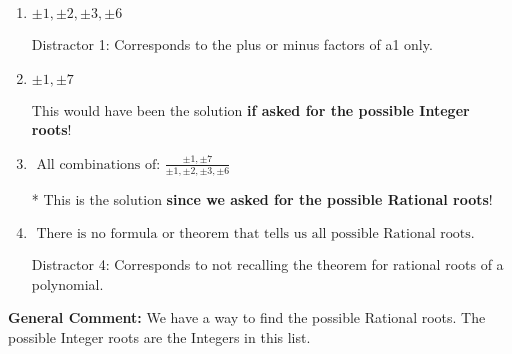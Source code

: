 \documentclass{extbook}[14pt]
\begin{document}
\begin{enumerate}
{\begin{enumerate}[label=\Alph*.]
 Distractor 3: Corresponds to the plus or minus of the inverse quotient (an/a0) of the factors. 
\item \( \pm 1,\pm 2,\pm 3,\pm 6 \)

 Distractor 1: Corresponds to the plus or minus factors of a1 only.
\item \( \pm 1,\pm 7 \)

This would have been the solution \textbf{if asked for the possible Integer roots}!
\item \( \text{ All combinations of: }\frac{\pm 1,\pm 7}{\pm 1,\pm 2,\pm 3,\pm 6} \)

* This is the solution \textbf{since we asked for the possible Rational roots}!
\item \( \text{ There is no formula or theorem that tells us all possible Rational roots.} \)

 Distractor 4: Corresponds to not recalling the theorem for rational roots of a polynomial.
\end{enumerate}

\textbf{General Comment:} We have a way to find the possible Rational roots. The possible Integer roots are the Integers in this list.
}
\end{enumerate}
\end{document}
